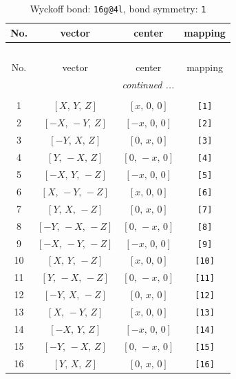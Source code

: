 \documentclass[fleqn,8pt]{jsarticle}
\begin{document}
\begin{longtable}{cccc}
\caption{Wyckoff bond: {\tt 16g@4l}, bond symmetry: {\tt 1}}
 \\
 \hline \hline
No. & vector & center & mapping \\ \hline \endfirsthead

\multicolumn{3}{l}{\tablename\ \thetable{}} \\
 \hline \hline
No. & vector & center & mapping \\ \hline \endhead

 \hline \hline
\multicolumn{3}{r}{\footnotesize\it continued ...} \\ \endfoot

 \hline \hline
\multicolumn{3}{r}{} \\ \endlastfoot

1 & $\left[ X,\, Y,\, Z \right]$ & $\left[ x,\, 0,\, 0 \right]$ & {\tt [1]} \\ \hline
2 & $\left[ - X,\, - Y,\, Z \right]$ & $\left[ - x,\, 0,\, 0 \right]$ & {\tt [2]} \\ \hline
3 & $\left[ - Y,\, X,\, Z \right]$ & $\left[ 0,\, x,\, 0 \right]$ & {\tt [3]} \\ \hline
4 & $\left[ Y,\, - X,\, Z \right]$ & $\left[ 0,\, - x,\, 0 \right]$ & {\tt [4]} \\ \hline
5 & $\left[ - X,\, Y,\, - Z \right]$ & $\left[ - x,\, 0,\, 0 \right]$ & {\tt [5]} \\ \hline
6 & $\left[ X,\, - Y,\, - Z \right]$ & $\left[ x,\, 0,\, 0 \right]$ & {\tt [6]} \\ \hline
7 & $\left[ Y,\, X,\, - Z \right]$ & $\left[ 0,\, x,\, 0 \right]$ & {\tt [7]} \\ \hline
8 & $\left[ - Y,\, - X,\, - Z \right]$ & $\left[ 0,\, - x,\, 0 \right]$ & {\tt [8]} \\ \hline
9 & $\left[ - X,\, - Y,\, - Z \right]$ & $\left[ - x,\, 0,\, 0 \right]$ & {\tt [9]} \\ \hline
10 & $\left[ X,\, Y,\, - Z \right]$ & $\left[ x,\, 0,\, 0 \right]$ & {\tt [10]} \\ \hline
11 & $\left[ Y,\, - X,\, - Z \right]$ & $\left[ 0,\, - x,\, 0 \right]$ & {\tt [11]} \\ \hline
12 & $\left[ - Y,\, X,\, - Z \right]$ & $\left[ 0,\, x,\, 0 \right]$ & {\tt [12]} \\ \hline
13 & $\left[ X,\, - Y,\, Z \right]$ & $\left[ x,\, 0,\, 0 \right]$ & {\tt [13]} \\ \hline
14 & $\left[ - X,\, Y,\, Z \right]$ & $\left[ - x,\, 0,\, 0 \right]$ & {\tt [14]} \\ \hline
15 & $\left[ - Y,\, - X,\, Z \right]$ & $\left[ 0,\, - x,\, 0 \right]$ & {\tt [15]} \\ \hline
16 & $\left[ Y,\, X,\, Z \right]$ & $\left[ 0,\, x,\, 0 \right]$ & {\tt [16]} \\
\end{longtable}
\end{document}
